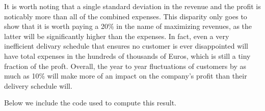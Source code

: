 \begin{paper}
It is worth noting that a single standard deviation in the revenue and the profit is noticably more than all of the combined expenses.
This disparity only goes to show that it is worth paying a 20\% in the name of maximizing revenues, as the latter will be significantly higher than the expenses.
In fact, even a very inefficient delivary schedule that ensures no customer is ever disappointed will have total expenses in the hundreds of thousands of Euros, which is still a tiny fraction of the proft.
Overall, the year to year fluctuations of customers by as much as 10\% will make more of an impact on the company's profit than their delivery schedule will.


Below we include the code used to compute this result.
\end{paper}




